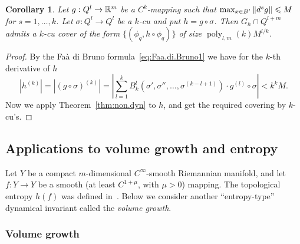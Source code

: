 \documentclass[reqno]{amsart}
\newtheorem{Cor}{Corollary}{\bfseries}{\itshape}
\renewcommand\~[1]{\widetilde{#1}}
\def\poly{\operatorname{poly}} \def\J{\operatorname{J}}
\begin{document}
\begin{Cor}\label{cor:non.dyn}
  Let $g:Q^l\to{\mathbb R}^m$ be a $C^k$-mapping such that
  $\max_{x\in B'}\left\Vert d^sg \right\Vert\leqslant M$ for $s=1,\ldots,k$. Let
  $\sigma:Q^l\to Q^l$ be a $k$-cu and put $h=g\circ\sigma$.  Then
  $G_h\cap Q^{l+m}$ admits a $k$-cu cover of the form
  $\{(\phi_q,h\circ\phi_q)\}$ of size $\poly_{l,m}(k)M^{l/k}$.
\end{Cor}
\begin{proof}
  By the Fa\`a di Bruno formula~\eqref{eq:Faa.di.Bruno1} we have for
  the $k$-th derivative of $h$
  \begin{equation}\label{eq:Faa.di.Bruno2}
    |h^{(k)}|=|(g\circ \sigma)^{(k)}|= |\sum_{l=1}^k B_k^l(\sigma',\sigma'',\ldots,\sigma^{(k-l+1)})\cdot g^{(l)}\circ \sigma| < k^kM.
  \end{equation}
  Now we apply Theorem~\ref{thm:non.dyn} to $h$, and get the required
  covering by $k$-cu's.
\end{proof}

\subsection{Applications to volume growth and entropy}
\label{sec:Dyn.Appl}

Let $Y$ be a compact $m$-dimensional $C^\infty$-smooth Riemannian
manifold, and let $f:Y\to Y$ be a smooth (at least $C^{1+\mu}$, with
$\mu>0$) mapping. The topological entropy $h(f)$ was defined
in~. Below we consider another
``entropy-type'' dynamical invariant called the \emph{volume growth}.

\subsubsection{Volume growth}
\end{document}
